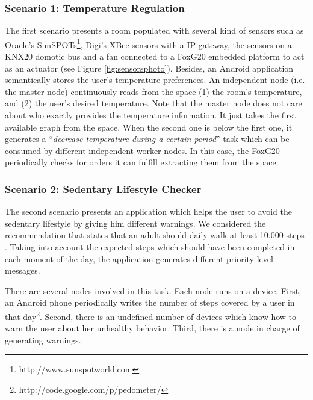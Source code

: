 \subsubsection{Scenario 1: Temperature Regulation}

The first scenario presents a room populated with several kind of sensors such as Oracle's SunSPOTs\footnote{http://www.sunspotworld.com},
Digi's XBee sensors with a IP gateway,
the sensors on a KNX20 domotic bus and a fan connected to a FoxG20 embedded platform to act as an actuator (see Figure \ref{fig:sensorsphoto}).
Besides, an Android application semantically stores the user's temperature preferences.
An independent node (i.e. the master node) continuously reads from the space %
(1) the room's temperature, and
(2) the user's desired temperature.
Note that the master node does not care about who exactly provides the temperature information.
It just takes the first available graph from the space.
When the second one is below the first one, it generates a ``\emph{decrease temperature during a certain period}'' task which can be consumed by different independent worker nodes.
In this case, the FoxG20 periodically checks for orders it can fulfill extracting them from the space. %



\subsubsection{Scenario 2: Sedentary Lifestyle Checker}

The second scenario presents an application which helps the user to avoid the sedentary lifestyle by giving him different warnings.
We considered the recommendation that states that an adult should daily walk at least 10.000 steps \citep{tudor2002taking}.
Taking into account the expected steps which should have been completed in each moment of the day, the application generates different priority level messages.

There are several nodes involved in this task.
Each node runs on a device. %
First, an Android phone periodically writes the number of steps covered by a user in that day\footnote{http://code.google.com/p/pedometer/}.
Second, there is an undefined number of devices which know how to warn the user about her unhealthy behavior.
Third, there is a node in charge of generating warnings.


